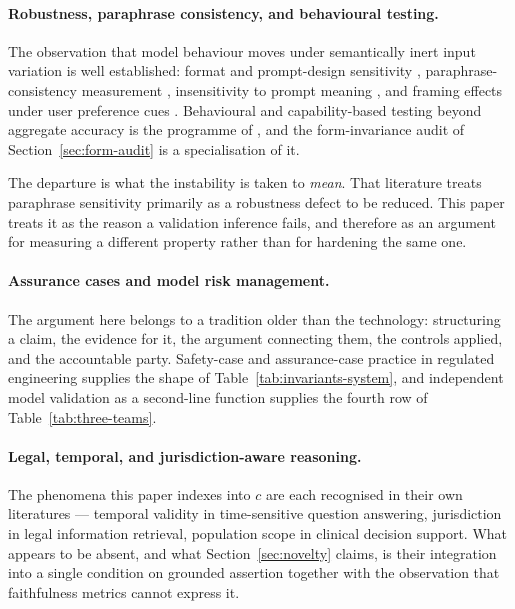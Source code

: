 \paragraph{Robustness, paraphrase consistency, and behavioural testing.} The
observation that model behaviour moves under semantically inert input variation is
well established: format and prompt-design sensitivity \citep{sclar2024},
paraphrase-consistency measurement \citep{elazar2021}, insensitivity to prompt meaning
\citep{webson2022}, and framing effects under user preference cues
\citep{sharma2024}. Behavioural and capability-based testing beyond aggregate accuracy
is the programme of \citet{ribeiro2020}, and the form-invariance audit of
Section~\ref{sec:form-audit} is a specialisation of it.

The departure is what the instability is taken to \emph{mean}. That literature treats
paraphrase sensitivity primarily as a robustness defect to be reduced. This paper
treats it as the reason a validation inference fails, and therefore as an argument for
measuring a different property rather than for hardening the same one.

\paragraph{Assurance cases and model risk management.} The argument here belongs to a
tradition older than the technology: structuring a claim, the evidence for it, the
argument connecting them, the controls applied, and the accountable party.
Safety-case and assurance-case practice in regulated engineering supplies the shape of
Table~\ref{tab:invariants-system}, and independent model validation as a second-line
function supplies the fourth row of Table~\ref{tab:three-teams}.

\paragraph{Legal, temporal, and jurisdiction-aware reasoning.} The phenomena this
paper indexes into $c$ are each recognised in their own literatures --- temporal
validity in time-sensitive question answering, jurisdiction in legal information
retrieval, population scope in clinical decision support.
What appears to be absent, and what Section~\ref{sec:novelty} claims, is their
integration into a single condition on grounded assertion together with the
observation that faithfulness metrics cannot express it.

